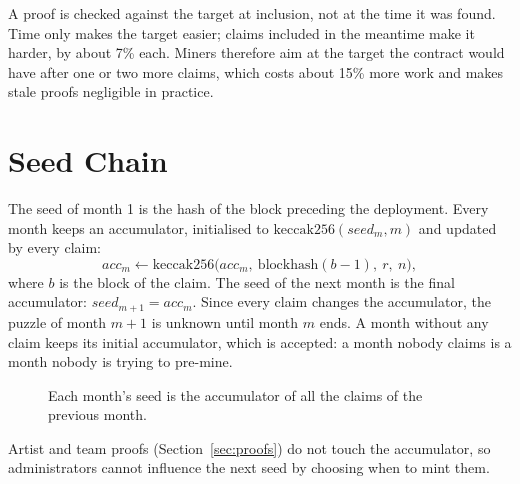 \documentclass[10pt,letterpaper]{article}
\begin{document}
A proof is checked against the target at inclusion, not at the time it was found. Time only makes the target
easier; claims included in the meantime make it harder, by about 7\% each. Miners therefore aim at the target the
contract would have after one or two more claims, which costs about 15\% more work and makes stale proofs
negligible in practice.

\section{Seed Chain}

The seed of month 1 is the hash of the block preceding the deployment. Every month keeps an accumulator,
initialised to $\mathrm{keccak256}(\mathit{seed}_m, m)$ and updated by every claim:
\[
  \mathit{acc}_m \leftarrow \mathrm{keccak256}\big(\mathit{acc}_m,\ \mathrm{blockhash}(b-1),\ r,\ n\big),
\]
where $b$ is the block of the claim. The seed of the next month is the final accumulator:
$\mathit{seed}_{m+1} = \mathit{acc}_m$. Since every claim changes the accumulator, the puzzle of month $m+1$ is
unknown until month $m$ ends. A month without any claim keeps its initial accumulator, which is accepted: a month
nobody claims is a month nobody is trying to pre-mine.

\begin{figure}[h]
\centering
{}
\caption*{\small Each month's seed is the accumulator of all the claims of the previous month.}
\end{figure}

Artist and team proofs (Section~\ref{sec:proofs}) do not touch the accumulator, so administrators cannot influence
the next seed by choosing when to mint them.
\end{document}
